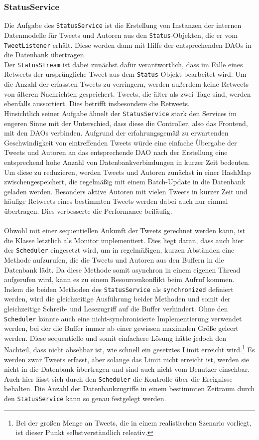 \subsubsection*{StatusService}
Die Aufgabe des \texttt{StatusService} ist die Erstellung von Instanzen der internen Datenmodelle für Tweets und Autoren aus den \texttt{Status}-Objekten, die er vom \texttt{TweetListener} erhält. Diese werden dann mit Hilfe der entsprechenden DAOs in die Datenbank übertragen. \\
Der \texttt{StatusStream} ist dabei zunächst dafür verantwortlich, dass im Falle eines Retweets der ursprüngliche Tweet aus dem \texttt{Status}-Objekt bearbeitet wird. Um die Anzahl der erfassten Tweets zu verringern, werden außerdem keine Retweets von älteren Nachrichten gespeichert. Tweets, die älter als zwei Tage sind, werden ebenfalls aussortiert. Dies betrifft insbesondere die Retweets. \\
Hinsichtlich seiner Aufgabe ähnelt der \texttt{StatusService} stark den Services im engeren Sinne mit der Unterschied, dass diese die Controller, also das Frontend, mit den DAOs verbinden. Aufgrund der erfahrungsgemäß zu erwartenden Geschwindigkeit von eintreffenden Tweets würde eine einfache Übergabe der Tweets und Autoren an das entsprechende DAO nach der Erstellung eine entsprechend hohe Anzahl von Datenbankverbindungen in kurzer Zeit bedeuten. Um diese zu reduzieren, werden Tweets und Autoren zunächst in einer HashMap zwischengespeichert, die regelmäßig mit einem Batch-Update in die Datenbank geladen werden. Besonders aktive Autoren mit vielen Tweets in kurzer Zeit und häufige Retweets eines bestimmten Tweets werden dabei auch nur einmal übertragen. Dies verbesserte die Performance beiläufig.
\\\\
Obwohl mit einer sequentiellen Ankunft der Tweets gerechnet werden kann, ist die Klasse letztlich als Monitor implementiert. Dies liegt daran, dass auch hier der \texttt{Scheduler} eingesetzt wird, um in regelmäßigen, kurzen Abständen eine Methode aufzurufen, die die Tweets und Autoren aus den Buffern in die Datenbank lädt. Da diese Methode somit asynchron in einem eigenen Thread aufgerufen wird, kann es zu einem Resourcenkonflikt beim Aufruf kommen. Indem die beiden Methoden des \texttt{StatusService} als \texttt{synchronized} definiert werden, wird die gleichzeitige Ausführung beider Methoden und somit der gleichzeitige Schreib- und Lesezugriff auf die Buffer verhindert. Ohne den \texttt{Scheduler} könnte auch eine nicht-synchronisierte Implementierung verwendet werden, bei der die Buffer immer ab einer gewissen maximalen Größe geleert werden. Diese sequentielle und somit einfachere Lösung hätte jedoch den Nachteil, dass nicht absehbar ist, wie schnell ein gesetztes Limit erreicht wird.\footnote{Bei der großen Menge an Tweets, die in einem realistischen Szenario vorliegt, ist dieser Punkt selbstverständlich releativ.} Es werden zwar Tweets erfasst, aber solange das Limit nicht erreicht ist, werden sie nicht in die Datenbank übertragen und sind auch nicht vom Benutzer einsehbar. Auch hier lässt sich durch den \texttt{Scheduler} die Kontrolle über die Ereignisse behalten. Die Anzahl der Datenbankzugriffe in einem bestimmten Zeitraum durch den \texttt{StatusService} kann so genau festgelegt werden.
%
